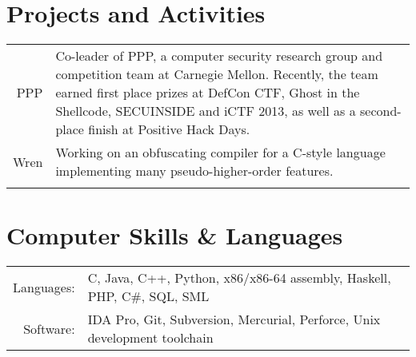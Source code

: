 \documentclass{article}
\begin{document}
\section{Projects and Activities}
\begin{tabular}{r|p{}}
PPP & \footnotesize{Co-leader of PPP, a computer security research group and competition team at
Carnegie Mellon. Recently, the team earned first place prizes at DefCon CTF, Ghost in the Shellcode, SECUINSIDE and iCTF
2013, as well as a second-place finish at Positive Hack Days.} \\
Wren & \footnotesize{Working on an obfuscating compiler for a C-style language implementing many pseudo-higher-order features.} \\
\multicolumn{2}{c}{}\\
\end{tabular}


\section{Computer Skills \& Languages}
\begin{tabular}{rl}
Languages: & C, Java, C++, Python, x86/x86-64 assembly, Haskell, PHP, C\#, SQL, SML \\
Software: & IDA Pro, Git, Subversion, Mercurial, Perforce, Unix development toolchain \\
\end{tabular}
\end{document}
